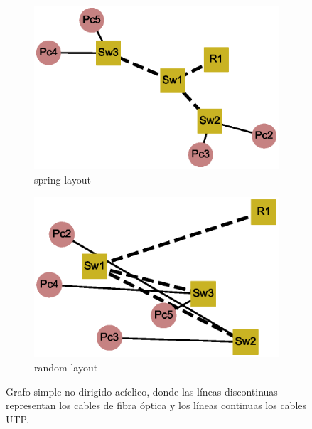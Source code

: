 \documentclass{article}
\begin{document}
\begin{center}

\end{center}
\begin{figure}[h]

\begin{subfigure}{0.5\textwidth}
\includegraphics[scale=0.4]{Graf1_spring_layout.eps} 
\caption{spring layout}
\end{subfigure}

\begin{subfigure}{0.5\textwidth}
\includegraphics[scale=0.4]{Graf1_random_layout.eps} 
\caption{random layout}
\end{subfigure}

\caption{Grafo simple no dirigido acíclico, donde las líneas discontinuas representan los cables de fibra óptica y los líneas continuas los cables UTP.}
\end{figure}
\end{document}
